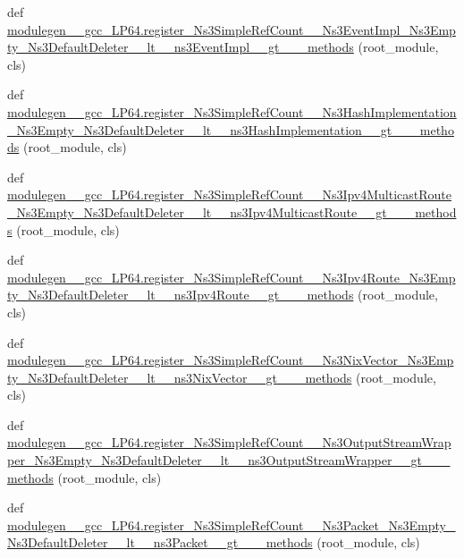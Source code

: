 \begin{DoxyCompactItemize}
\item 
def \hyperlink{namespacemodulegen____gcc__LP64_a0545c365b0db77cf144c477216b1292c}{modulegen\+\_\+\+\_\+gcc\+\_\+\+L\+P64.\+register\+\_\+\+Ns3\+Simple\+Ref\+Count\+\_\+\+\_\+\+Ns3\+Event\+Impl\+\_\+\+Ns3\+Empty\+\_\+\+Ns3\+Default\+Deleter\+\_\+\+\_\+lt\+\_\+\+\_\+ns3\+Event\+Impl\+\_\+\+\_\+gt\+\_\+\+\_\+\+\_\+methods} (root\+\_\+module, cls)
\item 
def \hyperlink{namespacemodulegen____gcc__LP64_a38845cc78a4819d6d5632f27e6fd34d9}{modulegen\+\_\+\+\_\+gcc\+\_\+\+L\+P64.\+register\+\_\+\+Ns3\+Simple\+Ref\+Count\+\_\+\+\_\+\+Ns3\+Hash\+Implementation\+\_\+\+Ns3\+Empty\+\_\+\+Ns3\+Default\+Deleter\+\_\+\+\_\+lt\+\_\+\+\_\+ns3\+Hash\+Implementation\+\_\+\+\_\+gt\+\_\+\+\_\+\+\_\+methods} (root\+\_\+module, cls)
\item 
def \hyperlink{namespacemodulegen____gcc__LP64_af851a865b43e2f11b9cc67cef8b80985}{modulegen\+\_\+\+\_\+gcc\+\_\+\+L\+P64.\+register\+\_\+\+Ns3\+Simple\+Ref\+Count\+\_\+\+\_\+\+Ns3\+Ipv4\+Multicast\+Route\+\_\+\+Ns3\+Empty\+\_\+\+Ns3\+Default\+Deleter\+\_\+\+\_\+lt\+\_\+\+\_\+ns3\+Ipv4\+Multicast\+Route\+\_\+\+\_\+gt\+\_\+\+\_\+\+\_\+methods} (root\+\_\+module, cls)
\item 
def \hyperlink{namespacemodulegen____gcc__LP64_af72ddb920d39271050611f34d89a68fa}{modulegen\+\_\+\+\_\+gcc\+\_\+\+L\+P64.\+register\+\_\+\+Ns3\+Simple\+Ref\+Count\+\_\+\+\_\+\+Ns3\+Ipv4\+Route\+\_\+\+Ns3\+Empty\+\_\+\+Ns3\+Default\+Deleter\+\_\+\+\_\+lt\+\_\+\+\_\+ns3\+Ipv4\+Route\+\_\+\+\_\+gt\+\_\+\+\_\+\+\_\+methods} (root\+\_\+module, cls)
\item 
def \hyperlink{namespacemodulegen____gcc__LP64_a965e9b7942715fc406cf9c83246b2bcb}{modulegen\+\_\+\+\_\+gcc\+\_\+\+L\+P64.\+register\+\_\+\+Ns3\+Simple\+Ref\+Count\+\_\+\+\_\+\+Ns3\+Nix\+Vector\+\_\+\+Ns3\+Empty\+\_\+\+Ns3\+Default\+Deleter\+\_\+\+\_\+lt\+\_\+\+\_\+ns3\+Nix\+Vector\+\_\+\+\_\+gt\+\_\+\+\_\+\+\_\+methods} (root\+\_\+module, cls)
\item 
def \hyperlink{namespacemodulegen____gcc__LP64_a44c8825c5388fc8e7a791e3762901c2b}{modulegen\+\_\+\+\_\+gcc\+\_\+\+L\+P64.\+register\+\_\+\+Ns3\+Simple\+Ref\+Count\+\_\+\+\_\+\+Ns3\+Output\+Stream\+Wrapper\+\_\+\+Ns3\+Empty\+\_\+\+Ns3\+Default\+Deleter\+\_\+\+\_\+lt\+\_\+\+\_\+ns3\+Output\+Stream\+Wrapper\+\_\+\+\_\+gt\+\_\+\+\_\+\+\_\+methods} (root\+\_\+module, cls)
\item 
def \hyperlink{namespacemodulegen____gcc__LP64_ad03a2df5680530337afef71c06f6d20d}{modulegen\+\_\+\+\_\+gcc\+\_\+\+L\+P64.\+register\+\_\+\+Ns3\+Simple\+Ref\+Count\+\_\+\+\_\+\+Ns3\+Packet\+\_\+\+Ns3\+Empty\+\_\+\+Ns3\+Default\+Deleter\+\_\+\+\_\+lt\+\_\+\+\_\+ns3\+Packet\+\_\+\+\_\+gt\+\_\+\+\_\+\+\_\+methods} (root\+\_\+module, cls)

\end{DoxyCompactItemize}
